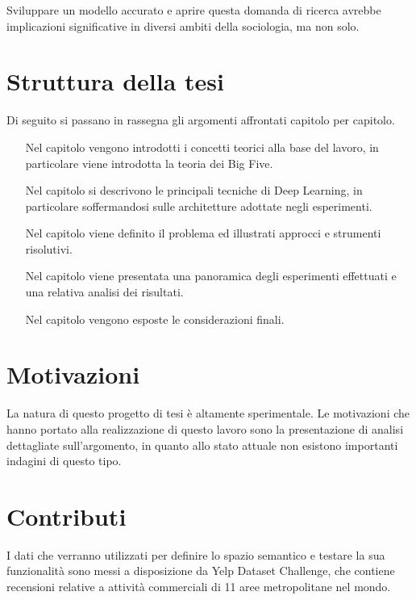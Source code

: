 Sviluppare un modello accurato e aprire questa domanda di ricerca avrebbe implicazioni significative in diversi ambiti della sociologia, ma non solo.

\section*{Struttura della tesi}
Di seguito si passano in rassegna gli argomenti affrontati capitolo per capitolo.

\begin{itemize}
	\item [Nel capitolo \setfont{\nameref{chap:contesto}}] vengono introdotti i concetti teorici alla base del lavoro, in particolare viene introdotta la teoria dei Big Five. 
	\item [Nel capitolo \setfont{ \nameref{chap:RetiNeurali}}] si descrivono le principali tecniche di Deep Learning, in particolare soffermandosi sulle architetture adottate negli esperimenti. 
	\item [Nel capitolo \setfont{\nameref{chap:formulazione}}] viene definito il problema ed illustrati approcci e strumenti risolutivi.
	\item [Nel capitolo \setfont{\nameref{chap:esperimenti}}] viene presentata una panoramica degli esperimenti effettuati e una relativa analisi dei risultati.
	\item [Nel capitolo \setfont{\nameref{chap:conclusioni}}] vengono esposte le considerazioni finali.
\end{itemize}

\section*{Motivazioni}
\label{sec:motivazione}

La natura di questo progetto di tesi è altamente sperimentale. Le motivazioni che hanno portato alla realizzazione di questo lavoro sono la presentazione di analisi dettagliate sull'argomento, in quanto allo stato attuale non esistono importanti indagini di questo tipo.

\section*{Contributi}
\label{sec:contributi}

I dati che verranno utilizzati per definire lo spazio semantico e testare la sua funzionalità sono messi a disposizione da Yelp Dataset Challenge, che contiene  recensioni relative a  attività commerciali di 11 aree metropolitane nel mondo. 

